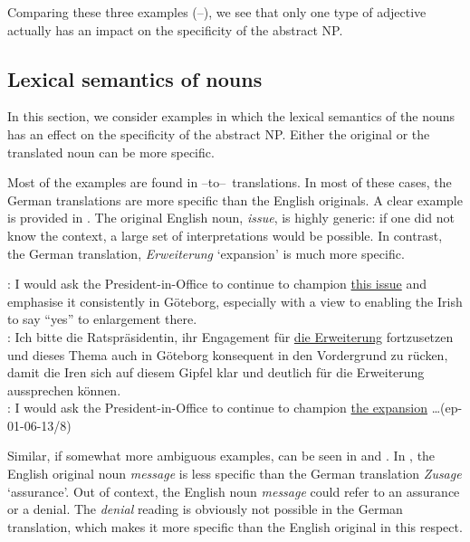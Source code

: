 \documentclass[output=paper]{LSP/langsci}
\begin{document}
Comparing these three examples (--), we see that only one type of adjective actually has an impact on the specificity of the abstract NP.


\subsection{Lexical semantics of nouns}
\label{sec:nouns}
In this section, we consider examples in which the lexical semantics of the nouns has an effect on the specificity of the abstract NP. Either the original or the translated noun can be more specific.

Most of the examples are found in \ENo--to--\DEt\ translations. In most of these cases, the German translations are more specific than the English originals. A clear example is provided in . The original English noun, {\it issue}, is highly generic: if one did not know the context,  a large set of interpretations would be possible. In contrast, the German translation, {\it Erweiterung} `expansion' is much more specific. 

\ea	\label{ex:erweiterung}
\ENo: I would ask the President-in-Office to continue to champion \ul{this issue}  and emphasise it consistently in G\"oteborg, especially with a view to enabling the Irish to say ``yes'' to enlargement there. \\
\DEt: Ich bitte die Ratspr\"asidentin, ihr Engagement f\"ur \ul{die Erweiterung} fortzusetzen  und dieses Thema auch in G\"oteborg konsequent in den Vordergrund zu r\"ucken, damit die Iren sich auf diesem Gipfel klar und deutlich f\"ur die Erweiterung aussprechen k\"onnen.\\
\DElit: I would ask the President-in-Office to continue to champion \ul{the expansion} \dots \hfill{(ep-01-06-13/8)}
\z

Similar, if somewhat more ambiguous examples, can be seen in  and . In , the English original noun {\it message} is less specific than the German translation {\it Zusage} `assurance'. Out of context, the English noun {\it message} could refer to an assurance or a denial. The {\it denial} reading is obviously not possible in the German translation, which makes it more specific than the English original in this respect.  %
\end{document}
